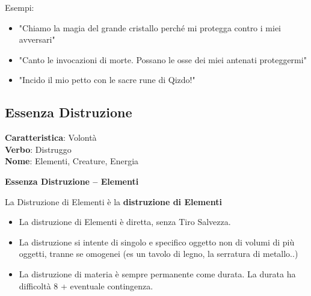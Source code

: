 \documentclass[a4paper,11pt,twoside,openany]{book}
\begin{document}
\bigskip

Esempi:
\begin{itemize}
	\item
	      "Chiamo la magia del grande cristallo perché mi protegga contro i miei avversari"
	\item
	      "Canto le invocazioni di morte. Possano le osse dei miei antenati proteggermi"
	\item
	      "Incido il mio petto con le sacre rune di Qizdo!"
\end{itemize}

\pagebreak

\subsection{Essenza Distruzione}

\textbf{Caratteristica}: Volontà\\
\textbf{Verbo}: Distruggo\\
\textbf{Nome}: Elementi, Creature, Energia\\

\label{essenza-distruzione---volonta}

\textbf{Essenza Distruzione -- Elementi}

La Distruzione di Elementi è la \textbf{distruzione di Elementi}
\begin{itemize}
	\item
	      La distruzione di Elementi è diretta, senza Tiro Salvezza.
	\item
	      La distruzione si intente di singolo e specifico oggetto non di volumi di più oggetti, tranne se omogenei (es un tavolo di legno, la serratura di metallo..)
	\item
	      La distruzione di materia è sempre permanente come durata. La durata ha difficoltà 8 + eventuale contingenza.
\end{itemize}

\bigskip
\end{document}
